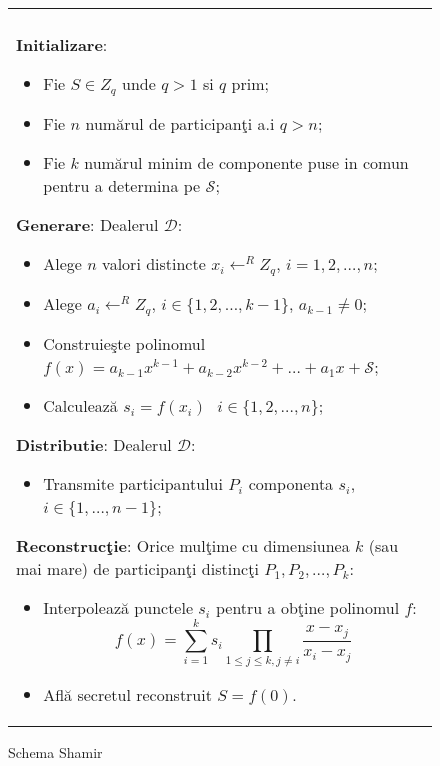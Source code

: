 \documentclass{llncs}
\begin{document}
\begin{figure*}[h!]

\begin{tabular}{|p{\textwidth}|}
\hline

\\
\hspace{.1in}
\textbf{Initializare}: 
	\begin{itemize}
		\item Fie $S \in Z_q$ unde $q > 1 $ si $q$ prim;
		\item Fie $n$ num\u{a}rul de participan\c{t}i a.i $q > n$;
		\item Fie $k$ num\u{a}rul minim de componente puse in comun pentru a determina pe $\mathcal{S}$;
	\end{itemize}
\medskip

\hspace{.1in}
\textbf{Generare}: Dealerul $\mathcal{D}$:
	\begin{itemize}
		\item Alege $n$ valori distincte $x_i \leftarrow^R Z_q \text{, }i = 1,2,\dots,n$;
		\item Alege $a_{i} \leftarrow^R Z_q \text{, }i \in \{1,2,\dots,{k - 1}$\}, $a_{k-1} \neq 0$;
		\item Construie\c{s}te polinomul $f(x) = a_{k - 1}x ^ {k-1} + a_{k-2}x ^ {k - 2} + \dots + a_1x + \mathcal{S}$;
		\item Calculeaz\u{a} $s_i = f(x_i) \text{ } i \in \{1,2,\dots,n\}$;
	\end{itemize}
\medskip

\hspace{.1in}
\textbf{Distributie}: Dealerul $\mathcal{D}$:
	\begin{itemize}
		\item Transmite participantului $P_i$ componenta $s_i$, $i \in \{1,\dots,n-1\}$;
	\end{itemize}

\hspace{.1in}
\textbf{Reconstruc\c{t}ie}: Orice mul\c{t}ime cu dimensiunea $k$ (sau mai mare) de participan\c{t}i distinc\c{t}i $P_1, P_2, \dots, P_k$:
	\begin{itemize}
		\setlength{\itemsep}{5pt}
		\item Interpoleaz\u{a} punctele $s_i$ pentru a ob\c{t}ine polinomul $f$:
		\begin{equation} f(x)=\sum_{i=1}^{k} {s_i}\prod_{1 \leq j \leq k, j \neq i} \frac{x-x_j}{x_i-x_j} \end{equation}
		\item Afl\u{a} secretul reconstruit $S = f(0)$.
	\end{itemize}

\\
\hline
\end{tabular}

\caption{Schema Shamir \cite{S:1979}}
\label{fig:shamir_scheme}
\end{figure*}
\end{document}
